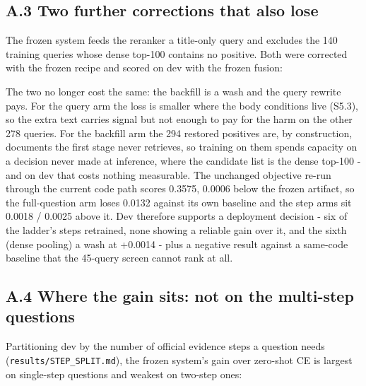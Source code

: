 \documentclass[11pt]{article}
\begin{document}
\subsection*{A.3 Two further corrections that also lose}
The frozen system feeds the reranker a title-only query and excludes the 140 training queries whose dense top-100 contains no positive. Both were corrected with the frozen recipe and scored on dev with the frozen fusion:

\begin{table}[t]
\centering
\footnotesize
{}%
\end{table}

The two no longer cost the same: the backfill is a wash and the query rewrite pays. For the query arm the loss is smaller where the body conditions live (S5.3), so the extra text carries signal but not enough to pay for the harm on the other 278 queries. For the backfill arm the 294 restored positives are, by construction, documents the first stage never retrieves, so training on them spends capacity on a decision never made at inference, where the candidate list is the dense top-100 - and on dev that costs nothing measurable. The unchanged objective re-run through the current code path scores 0.3575, 0.0006 below the frozen artifact, so the full-question arm loses 0.0132 against its own baseline and the step arms sit 0.0018 / 0.0025 above it. Dev therefore supports a deployment decision - six of the ladder’s steps retrained, none showing a reliable gain over it, and the sixth (dense pooling) a wash at +0.0014 - plus a negative result against a same-code baseline that the 45-query screen cannot rank at all.

\subsection*{A.4 Where the gain sits: not on the multi-step questions}
Partitioning dev by the number of official evidence steps a question needs (\texttt{results/STEP\_SPLIT.md}), the frozen system’s gain over zero-shot CE is largest on single-step questions and weakest on two-step ones:
\end{document}
